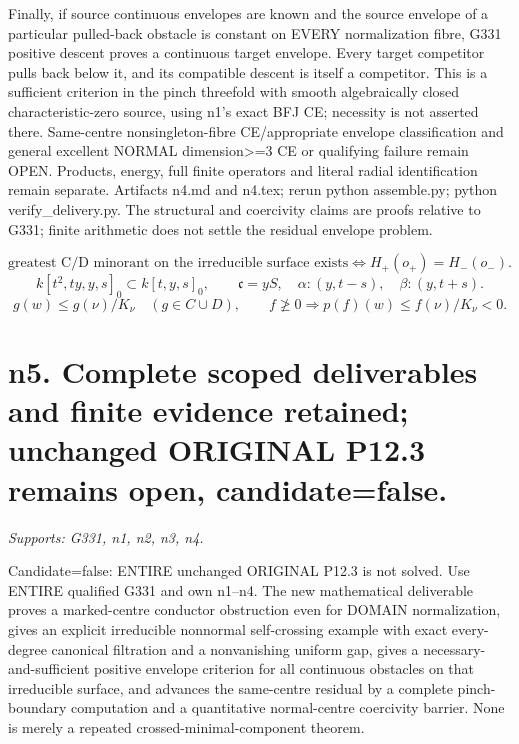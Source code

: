 \documentclass[11pt]{article}
\begin{document}
Finally, if source continuous envelopes are known and the source envelope of a particular pulled-back obstacle is constant on EVERY normalization fibre, G331 positive descent proves a continuous target envelope. Every target competitor pulls back below it, and its compatible descent is itself a competitor. This is a sufficient criterion in the pinch threefold with smooth algebraically closed characteristic-zero source, using n1's exact BFJ CE; necessity is not asserted there. Same-centre nonsingleton-fibre CE/appropriate envelope classification and general excellent NORMAL dimension\textgreater{}=3 CE or qualifying failure remain OPEN. Products, energy, full finite operators and literal radial identification remain separate. Artifacts n4.md and n4.tex; rerun python assemble.py; python verify\_delivery.py. The structural and coercivity claims are proofs relative to G331; finite arithmetic does not settle the residual envelope problem.

\[
 \text{greatest C/D minorant on the irreducible surface exists}
 \Longleftrightarrow H_+(o_+)=H_-(o_-).
\]
\[
 k[t^2,ty,y,s]_0\subset k[t,y,s]_0,\qquad
 \mathfrak c=yS,\quad \alpha:(y,t-s),\quad\beta:(y,t+s).
\]
\[
 g(w)\le g(\nu)/K_\nu\quad(g\in C\cup D),\qquad
 f\not\ge0\Longrightarrow p(f)(w)\le f(\nu)/K_\nu<0.
\]


\section{n5. Complete scoped deliverables and finite evidence retained; unchanged ORIGINAL P12.3 remains open, candidate=false.}
\textit{Supports: G331, n1, n2, n3, n4.}

Candidate=false: ENTIRE unchanged ORIGINAL P12.3 is not solved. Use ENTIRE qualified G331 and own n1--n4. The new mathematical deliverable proves a marked-centre conductor obstruction even for DOMAIN normalization, gives an explicit irreducible nonnormal self-crossing example with exact every-degree canonical filtration and a nonvanishing uniform gap, gives a necessary-and-sufficient positive envelope criterion for all continuous obstacles on that irreducible surface, and advances the same-centre residual by a complete pinch-boundary computation and a quantitative normal-centre coercivity barrier. None is merely a repeated crossed-minimal-component theorem.
\end{document}
